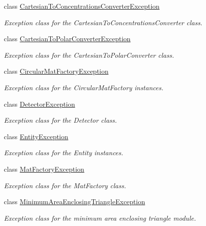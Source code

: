 \begin{DoxyCompactItemize}
\item 
class \hyperlink{classmultiscale_1_1CartesianToConcentrationsConverterException}{Cartesian\-To\-Concentrations\-Converter\-Exception}
\begin{DoxyCompactList}\small\item\em Exception class for the Cartesian\-To\-Concentrations\-Converter class. \end{DoxyCompactList}\item 
class \hyperlink{classmultiscale_1_1CartesianToPolarConverterException}{Cartesian\-To\-Polar\-Converter\-Exception}
\begin{DoxyCompactList}\small\item\em Exception class for the Cartesian\-To\-Polar\-Converter class. \end{DoxyCompactList}\item 
class \hyperlink{classmultiscale_1_1CircularMatFactoryException}{Circular\-Mat\-Factory\-Exception}
\begin{DoxyCompactList}\small\item\em Exception class for the Circular\-Mat\-Factory instances. \end{DoxyCompactList}\item 
class \hyperlink{classmultiscale_1_1DetectorException}{Detector\-Exception}
\begin{DoxyCompactList}\small\item\em Exception class for the Detector class. \end{DoxyCompactList}\item 
class \hyperlink{classmultiscale_1_1EntityException}{Entity\-Exception}
\begin{DoxyCompactList}\small\item\em Exception class for the Entity instances. \end{DoxyCompactList}\item 
class \hyperlink{classmultiscale_1_1MatFactoryException}{Mat\-Factory\-Exception}
\begin{DoxyCompactList}\small\item\em Exception class for the Mat\-Factory class. \end{DoxyCompactList}\item 
class \hyperlink{classmultiscale_1_1MinimumAreaEnclosingTriangleException}{Minimum\-Area\-Enclosing\-Triangle\-Exception}
\begin{DoxyCompactList}\small\item\em Exception class for the minimum area enclosing triangle module. \end{DoxyCompactList}\item 

\end{DoxyCompactItemize}
